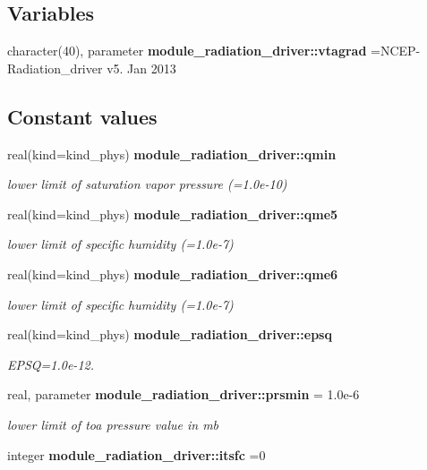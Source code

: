 \subsection*{Variables}
\begin{DoxyCompactItemize}
\item 
character(40), parameter \textbf{ module\+\_\+radiation\+\_\+driver\+::vtagrad} =\textquotesingle{}N\+C\+EP-\/Radiation\+\_\+driver v5. Jan 2013 \textquotesingle{}
\end{DoxyCompactItemize}
\subsection*{Constant values}
\begin{DoxyCompactItemize}
\item 
real(kind=kind\+\_\+phys) \textbf{ module\+\_\+radiation\+\_\+driver\+::qmin}
\begin{DoxyCompactList}\small\item\em lower limit of saturation vapor pressure (=1.\+0e-\/10) \end{DoxyCompactList}\item 
real(kind=kind\+\_\+phys) \textbf{ module\+\_\+radiation\+\_\+driver\+::qme5}
\begin{DoxyCompactList}\small\item\em lower limit of specific humidity (=1.\+0e-\/7) \end{DoxyCompactList}\item 
real(kind=kind\+\_\+phys) \textbf{ module\+\_\+radiation\+\_\+driver\+::qme6}
\begin{DoxyCompactList}\small\item\em lower limit of specific humidity (=1.\+0e-\/7) \end{DoxyCompactList}\item 
real(kind=kind\+\_\+phys) \textbf{ module\+\_\+radiation\+\_\+driver\+::epsq}
\begin{DoxyCompactList}\small\item\em E\+P\+SQ=1.\+0e-\/12. \end{DoxyCompactList}\item 
real, parameter \textbf{ module\+\_\+radiation\+\_\+driver\+::prsmin} = 1.\+0e-\/6
\begin{DoxyCompactList}\small\item\em lower limit of toa pressure value in mb \end{DoxyCompactList}\item 
integer \textbf{ module\+\_\+radiation\+\_\+driver\+::itsfc} =0

\end{DoxyCompactItemize}

